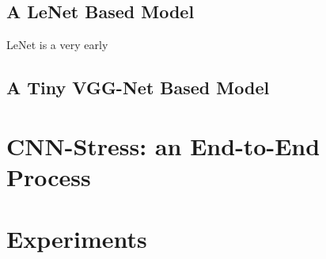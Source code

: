 \subsection{A LeNet Based Model}
LeNet is a very early 
\subsection{A Tiny VGG-Net Based Model}

\section{CNN-Stress: an End-to-End Process}

\section{Experiments}

